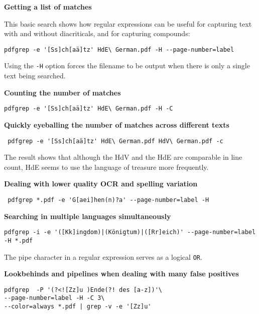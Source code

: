 \documentclass[
  letterpaper,
]{tufte-handout}
\begin{document}
\textbf{Getting a list of matches}

This basic search shows how regular expressions can be useful for
capturing text with and without diacriticals, and for capturing
compounds:

\begin{verbatim}
pdfgrep -e '[Ss]ch[aä]tz' HdE\ German.pdf -H --page-number=label
\end{verbatim}

Using the \texttt{-H} option forces the filename to be
output when there is only a single text being searched.

\textbf{Counting the number of matches}

\begin{verbatim}
pdfgrep -e '[Ss]ch[aä]tz' HdE\ German.pdf -H -C
\end{verbatim}

\textbf{Quickly eyeballing the number of matches across different texts}

\begin{verbatim}
 pdfgrep -e '[Ss]ch[aä]tz' HdE\ German.pdf HdV\ German.pdf -c
\end{verbatim}

The result shows that although the HdV and the HdE are comparable in
line count, HdE seems to use the language of treasure more frequently.

\textbf{Dealing with lower quality OCR and spelling variation}

\begin{verbatim}
 pdfgrep *.pdf -e 'G[aei]hen(n)?a' --page-number=label -H
\end{verbatim}

\textbf{Searching in multiple languages simultaneously}

\begin{verbatim}
pdfgrep -i -e '([Kk]ingdom)|(Königtum)|([Rr]eich)' --page-number=label -H *.pdf
\end{verbatim}

The pipe character in a regular expression serves as a logical
\texttt{OR}.

\textbf{Lookbehinds and pipelines when dealing with many false
positives}

\begin{verbatim}
pdfgrep  -P '(?<![Zz]u )Ende(?! des [a-z])'\
--page-number=label -H -C 3\
--color=always *.pdf | grep -v -e '[Zz]u'
\end{verbatim}
\end{document}
